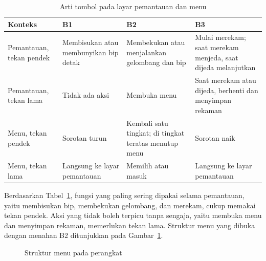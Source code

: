 \begin{table}[!ht]
  \centering
  \caption{Arti tombol pada layar pemantauan dan menu}
  \label{tab:peta-tombol}
  \setlength{\tabcolsep}{4pt}
  \renewcommand{\arraystretch}{1.15}
  \small
  \begin{tabular}{>{\RaggedRight\arraybackslash}p{2.4cm}>{\RaggedRight\arraybackslash}p{3.1cm}>{\RaggedRight\arraybackslash}p{3.1cm}>{\RaggedRight\arraybackslash}p{3.8cm}}
    \toprule
    \textbf{Konteks} & \textbf{B1} & \textbf{B2} & \textbf{B3} \\
    \midrule
    Pemantauan, tekan pendek & Membisukan atau membunyikan bip detak & Membekukan atau menjalankan gelombang dan bip & Mulai merekam; saat merekam menjeda, saat dijeda melanjutkan \\
    Pemantauan, tekan lama & Tidak ada aksi & Membuka menu & Saat merekam atau dijeda, berhenti dan menyimpan rekaman \\
    Menu, tekan pendek & Sorotan turun & Kembali satu tingkat; di tingkat teratas menutup menu & Sorotan naik \\
    Menu, tekan lama & Langsung ke layar pemantauan & Memilih atau masuk & Langsung ke layar pemantauan \\
    \bottomrule
  \end{tabular}
\end{table}

Berdasarkan Tabel~\ref{tab:peta-tombol}, fungsi yang paling sering dipakai selama pemantauan, yaitu membisukan bip, membekukan gelombang, dan merekam, cukup memakai tekan pendek. Aksi yang tidak boleh terpicu tanpa sengaja, yaitu membuka menu dan menyimpan rekaman, memerlukan tekan lama. Struktur menu yang dibuka dengan menahan B2 ditunjukkan pada Gambar~\ref{fig:3-pohon-menu}.

\begin{figure}[!ht]
  \centering
  \caption{Struktur menu pada perangkat}
  \label{fig:3-pohon-menu}
\end{figure}


